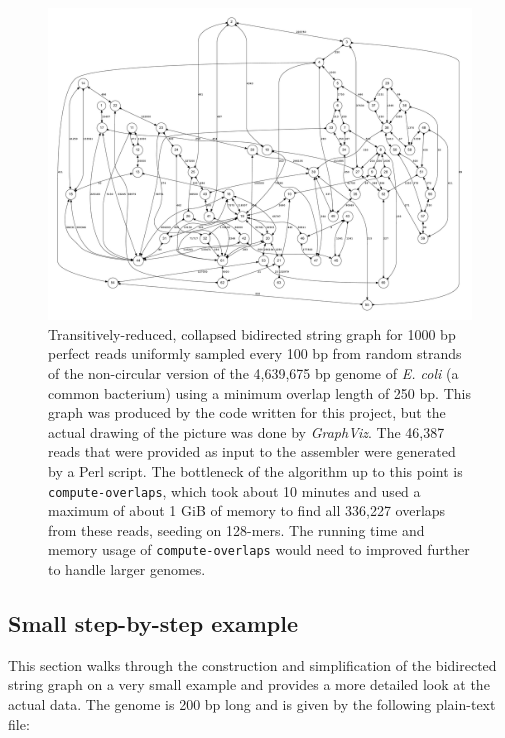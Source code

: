 \documentclass[12pt]{article}
\newcommand{\ProgramName}[1]{{\tt #1}}
\begin{document}
\begin{figure}
	\begin{center}
		\includegraphics[width=1.0\textwidth]{E_coli.pdf}
		\caption{Transitively-reduced, collapsed bidirected string graph for
		1000 bp perfect reads uniformly sampled every 100 bp from random strands
		of the non-circular version of the 4,639,675 bp genome of {\it E. coli}
		(a common bacterium) using a minimum overlap length of 250 bp.  This
		graph was produced by the code written for this project, but the actual
		drawing of the picture was done by {\it
		GraphViz}\cite{GraphVizPublication}.  The 46,387 reads
		that were provided as input to the assembler were generated by a Perl
		script.  The bottleneck of the algorithm up to this point is
		\ProgramName{compute-overlaps}, which took about 10 minutes and used a
		maximum of about 1 GiB of memory to find all 336,227 overlaps from these
		reads, seeding on 128-mers.  The running time and memory usage of
		\ProgramName{compute-overlaps} would need to improved further to handle
		larger genomes.}
		\label{fig:E_coli}
	\end{center}
\end{figure}

\subsection{Small step-by-step example}

This section walks through the construction and simplification of the bidirected
string graph on a very small example and provides a more detailed look at the
actual data.  The genome is 200 bp long and is given by the following plain-text
file:
\end{document}
